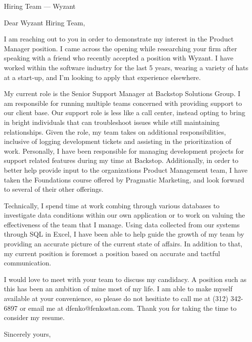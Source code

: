 \documentclass{scrlttr2}
\renewcommand{\\}{\ {\large\textperiodcentered}\ }
\begin{document}

\begin{letter}{ %
Hiring Team --- Wyzant\\
}

\opening{Dear Wyzant Hiring Team,}

I am reaching out to you in order to demonstrate my interest in the Product Manager position. I came across the opening while researching your firm after speaking with a friend who recently accepted a position with Wyzant. I have worked within the software industry for the last 5 years, wearing a variety of hats at a start-up, and I'm looking to apply that experience elsewhere.\\

My current role is the Senior Support Manager at Backstop Solutions Group. I am responsible for running multiple teams concerned with providing support to our client base. Our support role is less like a call center, instead opting to bring in bright individuals that can troubleshoot issues while still maintaining relationships. Given the role, my team takes on additional responsibilities, inclusive of logging development tickets and assisting in the prioritization of work. Personally, I have been responsible for managing development projects for support related features during my time at Backstop. Additionally, in order to better help provide input to the organizations Product Management team, I have taken the Foundations course offered by Pragmatic Marketing, and look forward to several of their other offerings.\\

Technically, I spend time at work combing through various databases to investigate data conditions within our own application or to work on valuing the effectiveness of the team that I manage. Using data collected from our systems through SQL in Excel, I have been able to help guide the growth of my team by providing an accurate picture of the current state of affairs. In addition to that, my current position is foremost a position based on accurate and tactful communication.\\

I would love to meet with your team to discuss my candidacy. A position such as this has been an ambition of mine most of my life. I am able to make myself available at your convenience, so please do not hesitiate to call me at (312) 342-6897 or email me at dfenko@fenkostan.com. Thank you for taking the time to consider my resume.\\

Sincerely yours, \\ \\


\end{letter}
\end{document}
